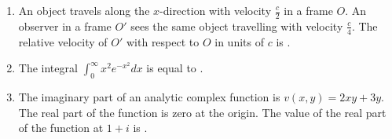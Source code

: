 \documentclass{article}
\newcommand{\brak}[1]{\left( #1 \right)}
\begin{document}
\begin{enumerate}
\item An object travels along the $x$-direction with velocity $\frac{c}{2}$ in a frame $O$. An observer in a frame $O'$ sees the same object travelling with velocity $\frac{c}{4}$. The relative velocity of $O'$ with respect to $O$ in units of $c$ is  .

 \item The integral $\int_{0}^{\infty} x^2 e^{-x^2} dx$ is equal to  .

 \item The imaginary part of an analytic complex function is $v\brak{x,y} = 2xy + 3y$. The real part of the function is zero at the origin. The value of the real part of the function at $1 + i$ is .

\end{enumerate}
\end{document}
